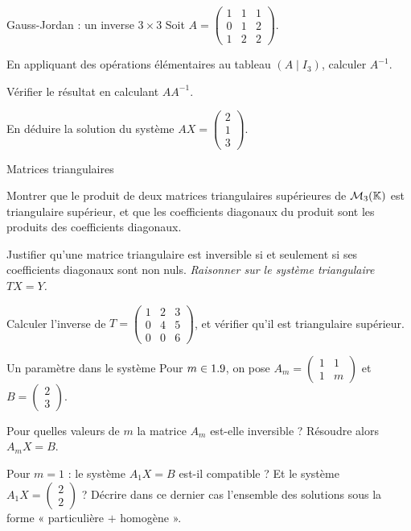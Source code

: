 \begin{exercice}[2]{Gauss-Jordan : un inverse $3\times3$}
Soit $A=\begin{pmatrix}1&1&1\\0&1&2\\1&2&2\end{pmatrix}$.
\begin{questions}
  \item En appliquant des opérations élémentaires au tableau
    $(A\mid I_3)$, calculer $A^{-1}$.
  \item Vérifier le résultat en calculant $AA^{-1}$.
  \item En déduire la solution du système $AX=\begin{pmatrix}2\\1\\3\end{pmatrix}$.
\end{questions}
\end{exercice}

\begin{exercice}[2]{Matrices triangulaires}
\begin{questions}
  \item Montrer que le produit de deux matrices triangulaires supérieures
    de $\mathcal{M}_3(\mathbb{K})$ est triangulaire supérieur, et que les
    coefficients diagonaux du produit sont les produits des coefficients
    diagonaux.
  \item Justifier qu'une matrice triangulaire est inversible si et
    seulement si ses coefficients diagonaux sont non nuls.
    \emph{Raisonner sur le système triangulaire $TX=Y$.}
  \item Calculer l'inverse de
    $T=\begin{pmatrix}1&2&3\\0&4&5\\0&0&6\end{pmatrix}$, et vérifier
    qu'il est triangulaire supérieur.
\end{questions}
\end{exercice}

\begin{exercice}[2]{Un paramètre dans le système}
Pour $m\in1.9$, on pose $A_m=\begin{pmatrix}1&1\\1&m\end{pmatrix}$ et
$B=\begin{pmatrix}2\\3\end{pmatrix}$.
\begin{questions}
  \item Pour quelles valeurs de $m$ la matrice $A_m$ est-elle inversible ?
    Résoudre alors $A_mX=B$.
  \item Pour $m=1$ : le système $A_1X=B$ est-il compatible ? Et le système
    $A_1X=\begin{pmatrix}2\\2\end{pmatrix}$ ? Décrire dans ce dernier cas
    l'ensemble des solutions sous la forme « particulière $+$ homogène ».
\end{questions}
\end{exercice}

